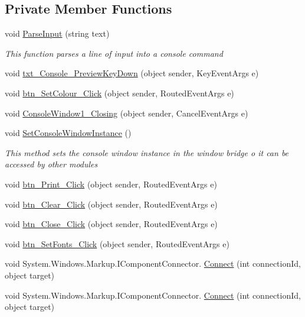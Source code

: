 \subsection*{Private Member Functions}
\begin{DoxyCompactItemize}
\item 
void \hyperlink{class_c_p_u___o_s___simulator_1_1_console_window_a0a66aa7f0e333cc919589a7ce4d584c0}{Parse\+Input} (string text)
\begin{DoxyCompactList}\small\item\em This function parses a line of input into a console command \end{DoxyCompactList}\item 
void \hyperlink{class_c_p_u___o_s___simulator_1_1_console_window_aabd331e8c3a83c87ccd2e09c3959408d}{txt\+\_\+\+Console\+\_\+\+Preview\+Key\+Down} (object sender, Key\+Event\+Args e)
\item 
void \hyperlink{class_c_p_u___o_s___simulator_1_1_console_window_a1de6be8bb7f4f581a9e4131a0408e632}{btn\+\_\+\+Set\+Colour\+\_\+\+Click} (object sender, Routed\+Event\+Args e)
\item 
void \hyperlink{class_c_p_u___o_s___simulator_1_1_console_window_a6b842220939aa42076c6770d646e2cc3}{Console\+Window1\+\_\+\+Closing} (object sender, Cancel\+Event\+Args e)
\item 
void \hyperlink{class_c_p_u___o_s___simulator_1_1_console_window_a8719d25b2617a32a78511d9e584d90a0}{Set\+Console\+Window\+Instance} ()
\begin{DoxyCompactList}\small\item\em This method sets the console window instance in the window bridge o it can be accessed by other modules \end{DoxyCompactList}\item 
void \hyperlink{class_c_p_u___o_s___simulator_1_1_console_window_ae362d36774ccfa84e775d6460e938a47}{btn\+\_\+\+Print\+\_\+\+Click} (object sender, Routed\+Event\+Args e)
\item 
void \hyperlink{class_c_p_u___o_s___simulator_1_1_console_window_a5bdaca75d834561bcf3e8ebef9f74926}{btn\+\_\+\+Clear\+\_\+\+Click} (object sender, Routed\+Event\+Args e)
\item 
void \hyperlink{class_c_p_u___o_s___simulator_1_1_console_window_ac971a3a0719009235a1dc369f6436df1}{btn\+\_\+\+Close\+\_\+\+Click} (object sender, Routed\+Event\+Args e)
\item 
void \hyperlink{class_c_p_u___o_s___simulator_1_1_console_window_a9b4298ff51320694cef9d160759700a3}{btn\+\_\+\+Set\+Fonts\+\_\+\+Click} (object sender, Routed\+Event\+Args e)
\item 
void System.\+Windows.\+Markup.\+I\+Component\+Connector. \hyperlink{class_c_p_u___o_s___simulator_1_1_console_window_a8fc3e3f38ff00f6239dca33ff68de0d2}{Connect} (int connection\+Id, object target)
\item 
void System.\+Windows.\+Markup.\+I\+Component\+Connector. \hyperlink{class_c_p_u___o_s___simulator_1_1_console_window_a8fc3e3f38ff00f6239dca33ff68de0d2}{Connect} (int connection\+Id, object target)
\end{DoxyCompactItemize}
